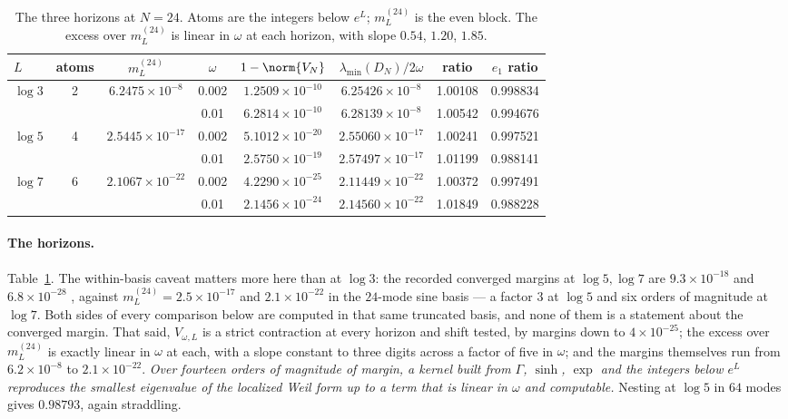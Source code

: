 \begin{table}[ht]\centering\small
\caption{The three horizons at $N=24$. Atoms are the integers below $e^L$;
$m_L^{(24)}$ is the even block. The excess over $m_L^{(24)}$ is linear in
$\omega$ at each horizon, with slope $0.54$, $1.20$, $1.85$.}\label{tab:horizons}
\begin{tabular}{@{}lccccccc@{}}
\toprule
$L$ & atoms & $m_L^{(24)}$ & $\omega$ & $1-\norm{V_N}$ & $\lambda_{\min}(D_N)/2\omega$ & ratio & $e_1$ ratio\\
\midrule
$\log3$ & 2 & $6.2475\times10^{-8}$ & 0.002 & $1.2509\times10^{-10}$ & $6.25426\times10^{-8}$ & 1.00108 & 0.998834\\
 & & & 0.01 & $6.2814\times10^{-10}$ & $6.28139\times10^{-8}$ & 1.00542 & 0.994676\\
$\log5$ & 4 & $2.5445\times10^{-17}$ & 0.002 & $5.1012\times10^{-20}$ & $2.55060\times10^{-17}$ & 1.00241 & 0.997521\\
 & & & 0.01 & $2.5750\times10^{-19}$ & $2.57497\times10^{-17}$ & 1.01199 & 0.988141\\
$\log7$ & 6 & $2.1067\times10^{-22}$ & 0.002 & $4.2290\times10^{-25}$ & $2.11449\times10^{-22}$ & 1.00372 & 0.997491\\
 & & & 0.01 & $2.1456\times10^{-24}$ & $2.14560\times10^{-22}$ & 1.01849 & 0.988228\\
\bottomrule
\end{tabular}
\end{table}

\paragraph{The horizons.} Table~\ref{tab:horizons}. The within-basis caveat
matters more here than at $\log3$: the recorded converged margins at
$\log5,\log7$ are $9.3\times10^{-18}$ and $6.8\times10^{-28}$
\cite{CriticalPath,FrameBound}, against $m_L^{(24)}=2.5\times10^{-17}$ and
$2.1\times10^{-22}$ in the $24$-mode sine basis --- a factor $3$ at $\log5$ and
six orders of magnitude at $\log7$. Both sides of every comparison below are
computed in that same truncated basis, and none of them is a statement about the
converged margin. That said, $V_{\omega,L}$ is a strict contraction at every
horizon and shift tested, by margins down to $4\times10^{-25}$; the excess over $m_L^{(24)}$ is exactly linear in $\omega$ at
each, with a slope constant to three digits across a factor of five in
$\omega$; and the margins themselves run from $6.2\times10^{-8}$ to
$2.1\times10^{-22}$. \emph{Over fourteen orders of magnitude of margin, a
kernel built from $\Gamma$, $\sinh$, $\exp$ and the integers below $e^L$
reproduces the smallest eigenvalue of the localized Weil form up to a term that
is linear in $\omega$ and computable.} Nesting at $\log5$ in $64$ modes gives
$0.98793$, again straddling.

